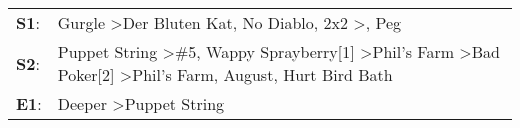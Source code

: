 \begin{supertabular}{p{0.03\textwidth}p{0.92\textwidth}}
 \textbf{S1}:  &                                                                                                                                      Gurgle\textsuperscript{} \textgreater \enspace Der Bluten Kat\textsuperscript{}, \enspace No Diablo\textsuperscript{}, \enspace 2x2\textsuperscript{} \textgreater {}\textsuperscript{}, \enspace Peg\textsuperscript{}  \enspace  \\
 \textbf{S2}:  &  Puppet String\textsuperscript{} \textgreater \enspace \#5\textsuperscript{}, \enspace Wappy Sprayberry[1]\textsuperscript{} \textgreater \enspace Phil's Farm\textsuperscript{} \textgreater \enspace Bad Poker[2]\textsuperscript{} \textgreater \enspace Phil's Farm\textsuperscript{}, \enspace August\textsuperscript{}, \enspace Hurt Bird Bath\textsuperscript{}  \enspace  \\
 \textbf{E1}:  &                                                                                                                                                                                                                                                                                          Deeper\textsuperscript{} \textgreater \enspace Puppet String\textsuperscript{}  \enspace  \\
\end{supertabular}

